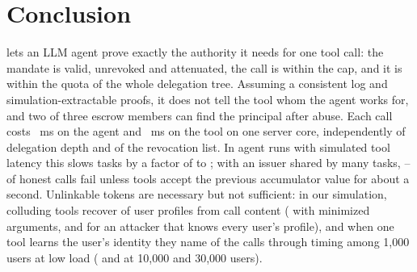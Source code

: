 \section{Conclusion}
\sys{} lets an LLM agent prove exactly the authority it needs for one tool call: the mandate is valid, unrevoked and attenuated, the call is within the cap, and it is within the quota of the whole delegation tree. Assuming a consistent log and simulation-extractable proofs, it does not tell the tool whom the agent works for, and two of three escrow members can find the principal after abuse. Each call costs \PresMs{}~ms on the agent and \VerMs{}~ms on the tool on one server core, independently of delegation depth and of the revocation list. In agent runs with simulated tool latency this slows tasks by a factor of \EFourSlowMin{} to \EFourSlowMax{}; with an issuer shared by many tasks, \EFourShRejMin{}--\EFourShRejMax{} of honest calls fail unless tools accept the previous accumulator value for about a second. Unlinkable tokens are necessary but not sufficient: in our simulation, colluding tools recover \LinkMMReid{} of user profiles from call content (\LinkMMMinReid{} with minimized arguments, and \LinkMMUpper{} for an attacker that knows every user's profile), and when one tool learns the user's identity they name \NameMM{} of the calls through timing among 1{,}000 users at low load (\NameMMTenK{} and \NameLoadHi{} at 10{,}000 and 30{,}000 users).

